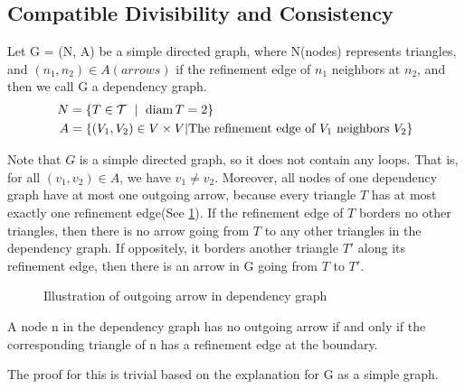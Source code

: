     \subsection{Compatible Divisibility and Consistency}
    \begin{definition}
      Let G = (N, A) be a simple directed graph, where N(nodes) represents triangles, and $(n_1, n_2)\in A (arrows)$ if the refinement edge of $n_1$ neighbors at $n_2$, and then we call G a dependency graph.
      \begin{align*}
      N &= \{T\in\mathcal{T}~\mid~\operatorname{diam}{T} = 2\}\\
      A &= \{(V_1, V_2)\in V\times V | \text{The refinement edge of $V_1$ neighbors $V_2$}\}
      \end{align*}
    \end{definition}
    Note that $G$ is a simple directed graph, so it does not contain any loops. That is, for all $(v_1, v_2)\in A$, we have $v_1\neq v_2$. Moreover, all nodes of one dependency graph have at most one outgoing arrow, because every triangle $T$ has at most exactly one refinement edge(See \ref{Fig9}). If the refinement edge of $T$ borders no other triangles, then there is no arrow going from $T$ to any other triangles in the dependency graph. If oppositely, it borders another triangle $T'$ along its refinement edge, then there is an arrow in G going from $T$ to $T'$.  %
    \begin{figure}[h!]
    \centering
    \caption{Illustration of outgoing arrow in dependency graph}
    \label{Fig9}
    \end{figure}

    \begin{lemma}
    A node n in the dependency graph has no outgoing arrow if and only if the corresponding triangle of n has a refinement edge at the boundary.
    \label{lma7}
    \end{lemma}
    The proof for this is trivial based on the explanation for G as a simple graph.


